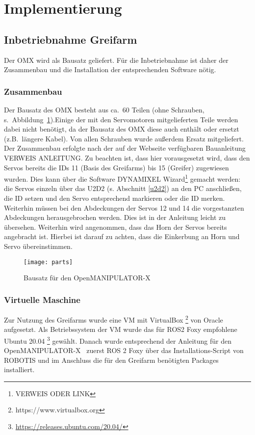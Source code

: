 \section{Implementierung}

\subsection {Inbetriebnahme Greifarm}
Der OMX wird als Bausatz geliefert.
Für die Inbetriebnahme ist daher der Zusammenbau und die Installation der entsprechenden Software nötig.
\subsubsection{Zusammenbau}
Der Bausatz des OMX besteht aus ca.\ 60 Teilen (ohne Schrauben, s.\ Abbildung~\ref{fig:omxparts}).Einige der mit den Servomotoren mitgelieferten Teile werden dabei nicht benötigt, da der Bausatz des OMX diese auch enthält oder ersetzt (z.B.\ längere Kabel).
Von allen Schrauben wurde außerdem Ersatz mitgeliefert.\\
Der Zusammenbau erfolgte nach der auf der Webseite verfügbaren Bauanleitung VERWEIS ANLEITUNG. Zu beachten ist, dass hier vorausgesetzt wird, dass den Servos bereits die IDs 11 (Basis des Greifarms) bis 15 (Greifer) zugewiesen wurden.
Dies kann über die Software DYNAMIXEL Wizard{\footnote{VERWEIS ODER LINK}} gemacht werden: die Servos einzeln über das U2D2 (s. Abschnitt {\ref{u2d2}}) an den PC anschließen, die ID setzen und den Servo entsprechend markieren oder die ID merken.
Weiterhin müssen bei den Abdeckungen der Servos 12 und 14 die vorgestanzten Abdeckungen herausgebrochen werden.
Dies ist in der Anleitung leicht zu übersehen.
Weiterhin wird angenommen, dass das Horn der Servos bereits angebracht ist.
Hierbei ist darauf zu achten, dass die Einkerbung an Horn und Servo übereinstimmen.
\begin{figure}[ht!]
\centering
\texttt{[image: parts]}
\caption{Bausatz für den OpenMANIPULATOR-X}
\label{fig:omxparts}
\end{figure}
\subsubsection{Virtuelle Maschine}
Zur Nutzung des Greifarms wurde eine \ac{VM} mit VirtualBox {\footnote{https://www.virtualbox.org}} von Oracle aufgesetzt.
Als Betriebssystem der \ac{VM} wurde das für ROS2 Foxy empfohlene~\citep{foxyreq} Ubuntu 20.04 {\footnote{\url{https://releases.ubuntu.com/20.04/}}} gewählt.
Danach wurde entsprechend der Anleitung für den OpenMANIPULATOR-X~\citep{foxyinstall} zuerst ROS 2 Foxy über das Installations-Script von ROBOTIS und im Anschluss die für den Greifarm benötigten Packages installiert.

